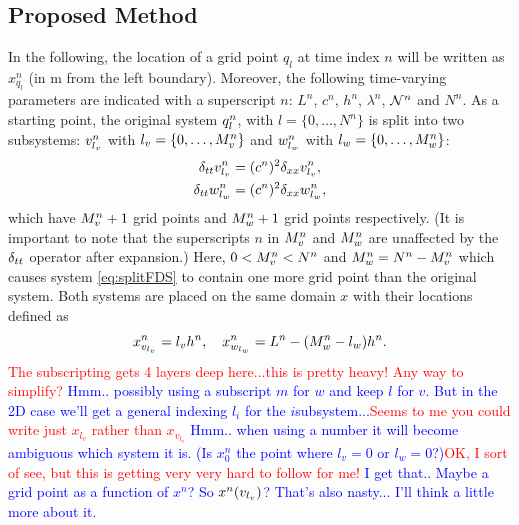 \documentclass[fleqn]{jaes}
\def\SBcomment[#1]{\textcolor{red}{#1}}
\def\SWcomment[#1]{\textcolor{blue}{#1}}
\begin{document}
\subsection{Proposed Method}
In the following, the location of a grid point $q_l$ at time index $n$ will be written as $x_{q_l}^n$ (in m from the left boundary). Moreover, the following time-varying parameters are indicated with a superscript $n$: $L^n$, $c^n$, $h^n$, $\lambda^n$, $\mathcal{N}^n$ and $N^n$. %
As a starting point, the original system $q_l^n$, with $l=\{0, \hdots, N^n\}$ is split into two subsystems: $v_{l_v}^n$ with $l_v=\{0, \hdots, M_v^n\}$ and $w_{l_w}^n$ with  $l_w=\{0, \hdots, M_w^n\}$:
\begin{subequations}\label{eq:splitFDS}
    \begin{align}
        \delta_{tt} v_{l_v}^n &= (c^n)^2\delta_{xx} v_{l_v}^n,\\
        \delta_{tt} w_{l_w}^n &= (c^n)^2\delta_{xx} w_{l_w}^n,
    \end{align}
\end{subequations}
which have $M_v^n+1$ grid points and $M_w^n+1$ grid points respectively. (It is important to note that the superscripts $n$ in $M_v^n$ and $M_w^n$ are unaffected by the $\delta_{tt}$ operator after expansion.) Here, $0<M_v^n<N^n$ and $M_w^n = N^n - M_v^n$ which causes system \eqref{eq:splitFDS} to contain one more grid point than the original system. Both systems are placed on the same domain $x$ with their locations defined as
\begin{equation}\label{eq:gridLocations}
    x_{v_\lv}^n =\lv h^n, \quad x_{w_\lw}^n = L^n-(\Mw-\lw)h^n.
\end{equation}
\SBcomment[The subscripting gets 4 layers deep here...this is pretty heavy! Any way to simplify?] \SWcomment[Hmm.. possibly using a subscript $m$ for $w$ and keep $l$ for $v$. But in the 2D case we'll get a general indexing $l_i$ for the $i$\th subsystem...]\SBcomment[Seems to me you could write just $x_{l_{v}}$ rather than $x_{v_{l_{v}}}$] \SWcomment[Hmm.. when using a number it will become ambiguous which system it is. (Is $x_0^n$ the point where $l_v = 0$ or $l_w = 0$?)]\SBcomment[OK, I sort of see, but this is getting very very hard to follow for me!] \SWcomment[I get that.. Maybe a grid point as a function of $x^n$? So $x^n(v_{l_v})$? That's also nasty... I'll think a little more about it.]
\end{document}
